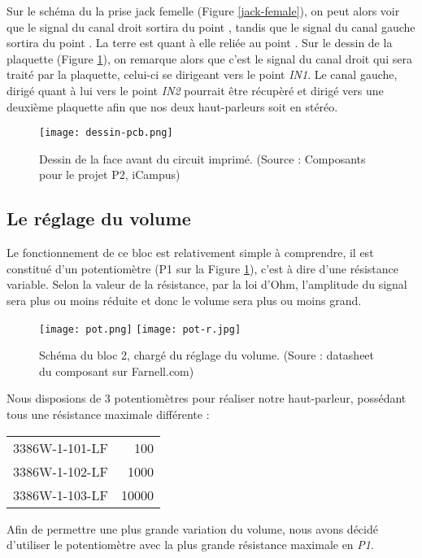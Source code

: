 Sur le schéma du la prise jack femelle (Figure \ref{jack-female}), on peut alors
voir que le signal du canal droit sortira du point , tandis que le signal du 
canal gauche sortira du point . La terre est quant à elle reliée au point
. Sur le dessin de la plaquette (Figure \ref{dessin-pcb}), on remarque alors
que c'est le signal du canal droit qui sera traité par la plaquette, celui-ci se dirigeant vers
le point \textit{IN1}. Le canal gauche, dirigé quant à lui vers le point \textit{IN2} pourrait
être récupèré et dirigé vers une deuxième plaquette afin que nos deux haut-parleurs soit en stéréo.

\begin{figure}[!hbt]
	\centering
	\texttt{[image: dessin-pcb.png]}
	\caption{Dessin de la face avant du circuit imprimé. (Source : Composants pour le projet P2, iCampus)}
	\label{dessin-pcb}
\end{figure}

\subsection{Le réglage du volume}
Le fonctionnement de ce bloc est relativement simple à comprendre, il est constitué d'un potentiomètre 
(P1 sur la Figure \ref{dessin-pcb}), c'est à dire d'une résistance variable.
Selon la valeur de la résistance, par la loi d'Ohm, l'amplitude du signal
sera plus ou moins réduite et donc le volume sera plus ou moins grand.

\begin{figure}[h]
	\centering
	\texttt{[image: pot.png]}
	\texttt{[image: pot-r.jpg]}
	\caption{Schéma du bloc 2, chargé du réglage du volume. (Soure : datasheet du composant sur Farnell.com)}
	\label{bloc2}
\end{figure}

Nous disposions de 3 potentiomètres pour réaliser notre haut-parleur, possédant
tous une résistance maximale différente :

\begin{center}
	\begin{tabular}{l|r}
	3386W-1-101-LF & \unit{100}{\ohm} \\
	3386W-1-102-LF & \unit{1000}{\ohm} \\
	3386W-1-103-LF & \unit{10000}{\ohm} 
	\end{tabular}
\end{center}

Afin de permettre une plus grande variation du volume, nous avons décidé d'utiliser
le potentiomètre avec la plus grande résistance maximale en \textit{P1}.

